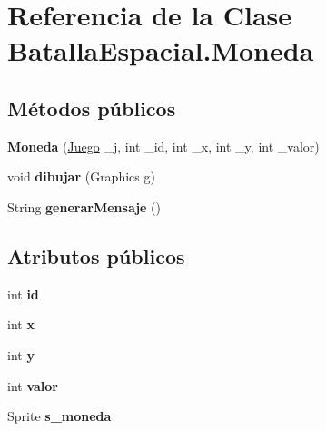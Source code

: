 \hypertarget{classBatallaEspacial_1_1Moneda}{
\section{Referencia de la Clase BatallaEspacial.Moneda}
\label{classBatallaEspacial_1_1Moneda}
}
\subsection*{Métodos públicos}
\begin{DoxyCompactItemize}
\item 
\hypertarget{classBatallaEspacial_1_1Moneda_a19446852af09b6e2aaf3de1d65609c0e}{
{\bfseries Moneda} (\hyperlink{classBatallaEspacial_1_1Juego}{Juego} \_\-j, int \_\-id, int \_\-x, int \_\-y, int \_\-valor)}
\label{classBatallaEspacial_1_1Moneda_a19446852af09b6e2aaf3de1d65609c0e}

\item 
\hypertarget{classBatallaEspacial_1_1Moneda_a3a4a0555bb60ceed72515d81b802d8e9}{
void {\bfseries dibujar} (Graphics g)}
\label{classBatallaEspacial_1_1Moneda_a3a4a0555bb60ceed72515d81b802d8e9}

\item 
\hypertarget{classBatallaEspacial_1_1Moneda_a8ca2f3a7d6bb712dbd145442ab2f3c5f}{
String {\bfseries generarMensaje} ()}
\label{classBatallaEspacial_1_1Moneda_a8ca2f3a7d6bb712dbd145442ab2f3c5f}

\end{DoxyCompactItemize}
\subsection*{Atributos públicos}
\begin{DoxyCompactItemize}
\item 
\hypertarget{classBatallaEspacial_1_1Moneda_a8ce4ba25109e1f32dee2754885acfc52}{
int {\bfseries id}}
\label{classBatallaEspacial_1_1Moneda_a8ce4ba25109e1f32dee2754885acfc52}

\item 
\hypertarget{classBatallaEspacial_1_1Moneda_ab553ded4797748974b843c01c5624611}{
int {\bfseries x}}
\label{classBatallaEspacial_1_1Moneda_ab553ded4797748974b843c01c5624611}

\item 
\hypertarget{classBatallaEspacial_1_1Moneda_acf7ef2c80589be7ba4c7d1e17e2eb07a}{
int {\bfseries y}}
\label{classBatallaEspacial_1_1Moneda_acf7ef2c80589be7ba4c7d1e17e2eb07a}

\item 
\hypertarget{classBatallaEspacial_1_1Moneda_a27759fbfad26176dde347b829136b4ef}{
int {\bfseries valor}}
\label{classBatallaEspacial_1_1Moneda_a27759fbfad26176dde347b829136b4ef}

\item 
\hypertarget{classBatallaEspacial_1_1Moneda_ae0687cdc1c7e039c2bceef5e9486ce0c}{
Sprite {\bfseries s\_\-moneda}}
\label{classBatallaEspacial_1_1Moneda_ae0687cdc1c7e039c2bceef5e9486ce0c}

\end{DoxyCompactItemize}
